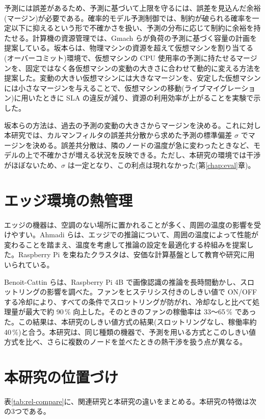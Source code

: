 予測には誤差があるため、予測に基づいて上限を守るには、誤差を見込んだ余裕(マージン)が必要である。確率的モデル予測制御\cite{mesbah2016smcp}では、制約が破られる確率を一定以下に抑えるという形で不確かさを扱い、予測の分布に応じて制約に余裕を持たせる。計算機の資源管理では、Gmach ら\cite{gmach2007capacity}が負荷の予測に基づく容量の計画を提案している。坂本ら\cite{sakamoto2018kbse}は、物理マシンの資源を超えて仮想マシンを割り当てる(オーバーコミット)環境で、仮想マシンの CPU 使用率の予測に持たせるマージンを、固定ではなく各仮想マシンの変動の大きさに合わせて動的に変える方法を提案した。変動の大きい仮想マシンには大きなマージンを、安定した仮想マシンには小さなマージンを与えることで、仮想マシンの移動(ライブマイグレーション)に用いたときに SLA の違反が減り、資源の利用効率が上がることを実験で示した。

坂本らの方法は、過去の予測の変動の大きさからマージンを決める。これに対し本研究では、カルマンフィルタの誤差共分散から求めた予測の標準偏差 $\sigma$ でマージンを決める。誤差共分散は、隣のノードの温度が急に変わったときなど、モデルの上で不確かさが増える状況を反映できる。ただし、本研究の環境では干渉がほぼないため、$\sigma$ は一定となり、この利点は現れなかった(第\ref{chap:eval}章)。

\section{エッジ環境の熱管理}\label{sec:rel-edge}
エッジの機器は、空調のない場所に置かれることが多く、周囲の温度の影響を受けやすい。Ahmadi ら\cite{edgeengine2023}は、エッジでの推論について、周囲の温度によって性能が変わることを踏まえ、温度を考慮して推論の設定を最適化する枠組みを提案した。Raspberry Pi を束ねたクラスタは、安価な計算基盤として教育や研究に用いられている\cite{iridispi2014}。

Benoit-Cattin ら\cite{benoitcattin2020throttling}は、Raspberry Pi 4B で画像認識の推論を長時間動かし、スロットリングの影響を調べた。ファンをヒステリシス付きのしきい値で ON/OFF する冷却により、すべての条件でスロットリングが防がれ、冷却なしと比べて処理量が最大で約 90\,\% 向上した。そのときのファンの稼働率は 33〜65\,\% であった。この結果は、本研究のしきい値方式の結果(スロットリングなし、稼働率約 40\,\%)と合う。本研究は、同じ種類の機器で、予測を用いる方式とこのしきい値方式を比べ、さらに複数のノードを並べたときの熱干渉を扱う点が異なる。

\section{本研究の位置づけ}\label{sec:rel-position}
表\ref{tab:rel-compare}に、関連研究と本研究の違いをまとめる。本研究の特徴は次の3つである。

